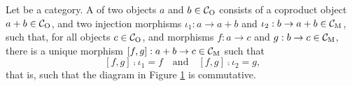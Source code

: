 \begin{definition}

  \label{def:coproduct}


  Let  be a category. A  of two objects $a$ and
  $b \in \mathcal{C}_{\operatorname{O}}$ consists of a coproduct object $a + b \in
  \mathcal{C}_{\operatorname{O}}$, and two injection morphisms $\iota_{1}: a \to a + b$ and
  $\iota_{2}: b \to a + b \in \mathcal{C}_{\operatorname{M}}$, such that, for all objects $c
  \in \mathcal{C}_{\operatorname{O}}$, and morphisms $f: a \to c$ and $g: b \to c \in
  \mathcal{C}_{\operatorname{M}}$, there is a unique morphism $[f,g]: a + b \to c \in
  \mathcal{C}_{\operatorname{M}}$ such that
  \begin{equation}
    \label{eq:coproduct}
    [f,g] \comp \iota_{1} = f
    \quad
    \text{and}
    \quad
    [f,g] \comp \iota_{2} = g
    \text{,}
  \end{equation}
  that is, such that the diagram in Figure \ref{fig:coproduct} is
  commutative.
  \begin{figure}[htbp]
    \begin{center}
    \end{center}
    \caption{}
    \label{fig:coproduct}
  \end{figure}

\end{definition}


